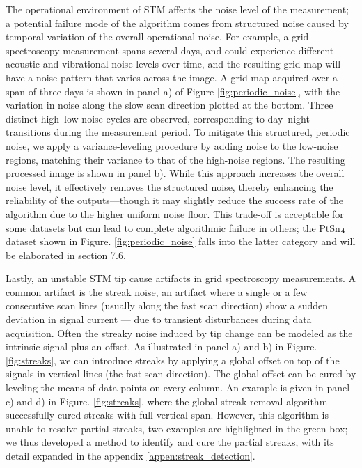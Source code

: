 The operational environment of STM affects the noise level of the measurement; a potential failure mode of the algorithm comes from structured noise caused by temporal variation of the overall operational noise. For example, a grid spectroscopy measurement spans several days, and could experience different acoustic and vibrational noise levels over time, and the resulting grid map will have a noise pattern that varies across the image. A grid map acquired over a span of three days is shown in panel a) of Figure \ref{fig:periodic_noise}, with the variation in noise along the slow scan direction plotted at the bottom. Three distinct high–low noise cycles are observed, corresponding to day–night transitions during the measurement period. To mitigate this structured, periodic noise, we apply a variance-leveling procedure by adding noise to the low-noise regions, matching their variance to that of the high-noise regions. The resulting processed image is shown in panel b). While this approach increases the overall noise level, it effectively removes the structured noise, thereby enhancing the reliability of the outputs—though it may slightly reduce the success rate of the algorithm due to the higher uniform noise floor. This trade-off is acceptable for some datasets but can lead to complete algorithmic failure in others; the PtSn$\textsubscript{4}$ dataset shown in Figure. \ref{fig:periodic_noise} falls into the latter category and will be elaborated in section 7.6. 

Lastly, an unstable \ac{STM} tip cause artifacts in grid spectroscopy measurements. A common  artifact is the streak noise, an artifact where a single or a few consecutive scan lines (usually along the fast scan direction) show a sudden deviation in signal current — due to transient disturbances during data acquisition. Often the streaky noise induced by tip change can be modeled as the intrinsic signal plus an offset. As illustrated in panel a) and b) in Figure. \ref{fig:streaks}, we can introduce streaks by applying a global offset on top of the signals in vertical lines (the fast scan direction). The global offset can be cured by leveling the means of data points on every column. An example is given in panel c) and d) in Figure. \ref{fig:streaks}, where the global streak removal algorithm successfully cured streaks with full vertical span. However, this algorithm is unable to resolve partial streaks, two examples are highlighted in the green box; we thus developed a method to identify and cure the partial streaks, with its detail expanded in the appendix \ref{appen:streak_detection}.

